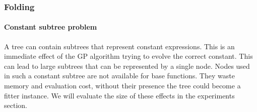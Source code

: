 \subsubsection{Folding}

\paragraph{Constant subtree problem}
A tree can contain subtrees that represent constant expressions. This is an immediate effect of the GP algorithm trying to evolve the correct constant. This can lead to large subtrees that can be represented by a single node. Nodes used in such a constant subtree are not available for base functions. They waste memory and evaluation cost, without their presence the tree could become a fitter instance. We will evaluate the size of these effects in the experiments section.

